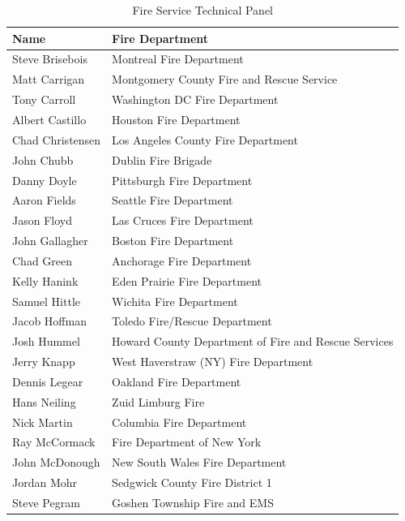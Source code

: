 \documentclass{article}
\begin{document}
\begin{table}[H]
	\centering
	\caption*{Fire Service Technical Panel}
	\begin{tabular}{ll}
		\toprule[1.5pt]
		Name & Fire Department \\ 
		\midrule
		Steve Brisebois  & Montreal Fire Department \\ 
		Matt Carrigan    & Montgomery County Fire and Rescue Service \\ 
		Tony Carroll     & Washington DC Fire Department \\ 
		Albert Castillo  & Houston Fire Department \\ 
		Chad Christensen & Los Angeles County Fire Department \\ 
		John Chubb       & Dublin Fire Brigade \\ 		 		  
		Danny Doyle      & Pittsburgh Fire Department \\ 
		Aaron Fields     & Seattle Fire Department \\ 
		Jason Floyd      & Las Cruces Fire Department \\ 
		John Gallagher   & Boston Fire Department \\ 
		Chad Green       & Anchorage Fire Department \\ 
		Kelly Hanink     & Eden Prairie Fire Department \\ 
		Samuel Hittle    & Wichita Fire Department \\ 
		Jacob Hoffman    & Toledo Fire/Rescue Department \\ 
		Josh Hummel      & Howard County Department of Fire and Rescue Services \\ 
		Jerry Knapp      & West Haverstraw (NY) Fire Department \\ 
		Dennis Legear    & Oakland Fire Department \\ 
		Hans Neiling     & Zuid Limburg Fire \\ 
		Nick Martin      & Columbia Fire Department \\ 
		Ray McCormack    & Fire Department of New York \\ 
		John McDonough   & New South Wales Fire Department \\ 
		Jordan Mohr      & Sedgwick County Fire District 1 \\ 
		Steve Pegram     & Goshen Township Fire and EMS \\ 
		\bottomrule[1.25pt]
	\end{tabular}
\end{table}
\end{document}

